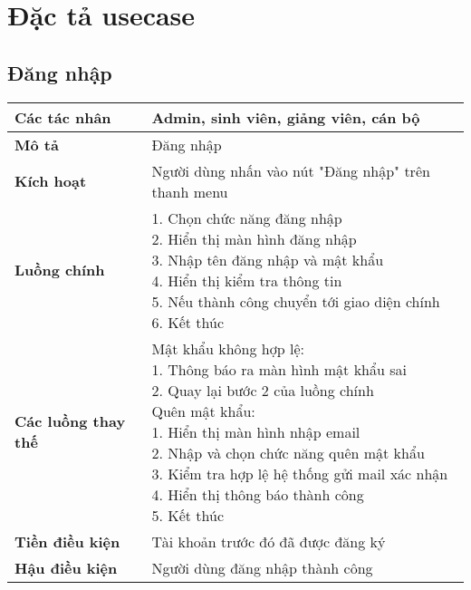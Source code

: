 \section{Đặc tả usecase}
\subsection*{Đăng nhập}
	\begin{tabular}{|l|p{}|}
		\hline
		\textbf{Các tác nhân}         & Admin, sinh viên, giảng viên, cán bộ \\
		\hline
		\textbf{Mô tả}                & Đăng nhập                                           \\
		\hline
		\textbf{Kích hoạt}            & Người dùng nhấn vào nút "Đăng nhập" trên thanh menu \\
		\hline
		\textbf{Luồng chính}          & \makecell[l]{1. Chọn chức năng đăng nhập            \\ 2. Hiển thị màn hình đăng nhập \\ 3. Nhập tên đăng nhập và mật khẩu \\ 4. Hiển thị kiểm tra thông tin \\ 5. Nếu thành công chuyển tới giao diện chính \\ 6. Kết thúc} \\
		\hline
		\textbf{Các luồng thay thế}   & \makecell[l]{Mật khẩu không hợp lệ:                 \\ 1. Thông báo ra màn hình mật khẩu sai \\ 2. Quay lại bước 2 của luồng chính \\ Quên mật khẩu: \\ 1. Hiển thị màn hình nhập email \\ 2. Nhập và chọn chức năng quên mật khẩu \\ 3. Kiểm tra hợp lệ hệ thống gửi mail xác nhận \\ 4. Hiển thị thông báo thành công \\ 5. Kết thúc} \\
		\hline
		\textbf{Tiền điều kiện}       & Tài khoản trước đó đã được đăng ký                  \\
		\hline
		\textbf{Hậu điều kiện}        & Người dùng đăng nhập thành công                     \\
		\hline
	\end{tabular}

